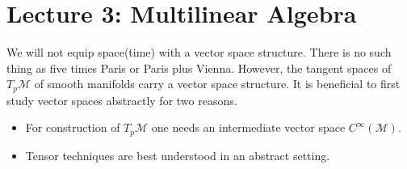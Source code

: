 \documentclass[10pt, oneside]{article}
\newcommand{\M}{\mathcal{M}}
\begin{document}
\section*{Lecture 3: Multilinear Algebra}
        We will not equip space(time) with a vector space structure. There is no such thing as five times Paris or Paris plus Vienna. However, the tangent spaces of $T_p \M$ of smooth manifolds carry a vector space structure.
        It is beneficial to first study vector spaces abstractly for two reasons.
        \begin{itemize}
           \item For construction of $T_p \M$ one needs an intermediate vector space $C^\infty (\M)$.
           \item Tensor techniques are best understood in an abstract setting.
        \end{itemize}
\end{document}
